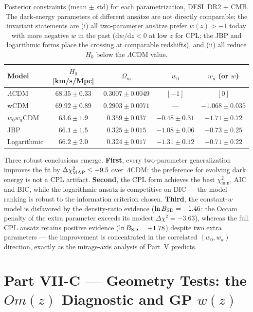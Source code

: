 \begin{table}[h]
\centering
\caption{Posterior constraints (mean $\pm$ std) for each parametrization,
DESI~DR2 + CMB. The dark-energy parameters of different ans\"atze are not
directly comparable; the invariant statements are (i) all two-parameter
ans\"atze prefer $w(z) > -1$ today with more negative $w$ in the past
($\mathrm{d}w/\mathrm{d}z < 0$ at low $z$ for CPL; the JBP and logarithmic
forms place the crossing at comparable redshifts), and (ii) all reduce
$H_0$ below the $\Lambda$CDM value.}
\begin{tabular}{lcccc}
\toprule
Model & $H_0$ [km/s/Mpc] & $\Omega_m$ & $w_0$ & $w_a$ (or $w$) \\
\midrule
$\Lambda$CDM & $68.35\pm0.33$ & $0.3007\pm0.0049$ & $[-1]$ & $[0]$ \\
wCDM         & $69.92\pm0.89$ & $0.2903\pm0.0071$ & --- & $-1.068\pm0.035$ \\
$w_0w_a$CDM  & $63.6\pm1.9$   & $0.359\pm0.037$   & $-0.48\pm0.31$ & $-1.71\pm0.72$ \\
JBP          & $66.1\pm1.5$   & $0.325\pm0.015$   & $-1.08\pm0.06$ & $+0.73\pm0.25$ \\
Logarithmic  & $66.2\pm2.0$   & $0.324\pm0.017$   & $-1.31\pm0.12$ & $+0.71\pm0.22$ \\
\bottomrule
\end{tabular}
\label{tab:robustness}
\end{table}

Three robust conclusions emerge. \textbf{First}, every two-parameter
generalization improves the fit by $\Delta\chi^2_{\rm MAP} \le -9.5$ over
$\Lambda$CDM: the preference for evolving dark energy is not a CPL artifact.
\textbf{Second}, the CPL form achieves the best $\chi^2_{\min}$, AIC and BIC,
while the logarithmic ansatz is competitive on DIC --- the model ranking is
robust to the information criterion chosen. \textbf{Third}, the constant-$w$
model is disfavored by the density-ratio evidence
($\ln B_{\rm SD} = -1.46$: the Occam penalty of the extra parameter exceeds its
modest $\Delta\chi^2 = -3.63$), whereas the full CPL ansatz retains positive
evidence ($\ln B_{\rm SD} = +1.78$) despite two extra parameters --- the
improvement is concentrated in the correlated $(w_0, w_a)$ direction, exactly
as the mirage-axis analysis of Part~V predicts.

\section{Part VII-C --- Geometry Tests: the $Om(z)$ Diagnostic and GP $w(z)$}
\label{sec:omdiag}

